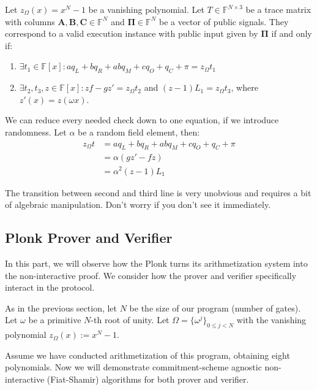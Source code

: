 \documentclass[../lecture-notes.tex]{subfiles}
\begin{document}
\begin{definition}
Let $z_{\Omega}(x) = x^N - 1$ be a vanishing polynomial. Let $T \in \mathbb{F}^{N
\times 3}$ be a trace matrix with columns $\mathbf{A}, \mathbf{B}, \mathbf{C}
\in \mathbb{F}^N$ and $\boldsymbol{\Pi} \in \mathbb{F}^N$ be a vector of public
signals. They correspond to a valid execution instance with public input given
by $\boldsymbol{\Pi}$ if and only if:

\begin{enumerate}
    \item \(\exists t_1 \in \mathbb{F}[x]: aq_L + bq_R + abq_M + cq_O + q_C + \pi = z_{\Omega}t_1\)
    \item \(\exists t_2, t_3, z \in \mathbb{F}[x]: zf - gz' = z_{\Omega}t_2\) and \((z-1)L_1 = z_{\Omega}t_3\), where $z'(x) = z(\omega x)$.
\end{enumerate}
\end{definition}
\begin{remark}
We can reduce every needed check down to one equation, if we introduce randomness.
Let $\alpha$ be a random field element, then: 
\[
    \begin{aligned}
        z_{\Omega}t &= aq_L + bq_R + abq_M + cq_O + q_C + \pi \\
        &= \alpha(gz' - fz) \\
        &= \alpha^2(z - 1)L_1
    \end{aligned}
\]

The transition between second and third line is very unobvious and requires a 
bit of algebraic manipulation. Don't worry if you don't see it immediately.
\end{remark}


\subsection{Plonk Prover and Verifier}

In this part, we will observe how the Plonk turns its arithmetization system
into the non-interactive proof. We consider how the prover and verifier specifically interact
in the protocol.

As in the previous section, let $N$ be the size of our program (number of
gates). Let $\omega$ be a primitive $N$-th root of unity. Let $\Omega =
\{\omega^j\}_{0 \leq j < N}$ with the vanishing polynomial $z_{\Omega}(x) := x^N
- 1$.

Assume we have conducted arithmetization of this program, obtaining eight
polynomials. Now we will demonstrate commitment-scheme agnostic non-interactive
(Fiat-Shamir) algorithms for both prover and verifier.
\end{document}
